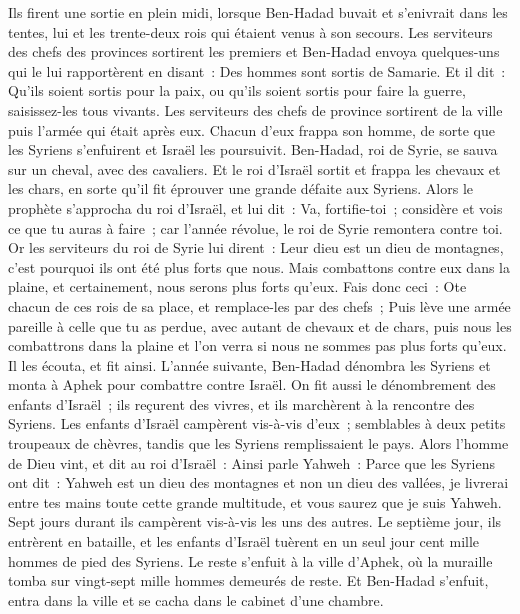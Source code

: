 \begin{multicols}{2}
Ils firent une sortie en plein midi, lorsque Ben-Hadad buvait et s'enivrait dans les tentes, lui et les trente-deux rois qui étaient venus à son secours.
Les serviteurs des chefs des provinces sortirent les premiers et Ben-Hadad envoya quelques-uns qui le lui rapportèrent en disant~: Des hommes sont sortis de Samarie.
Et il dit~: Qu'ils soient sortis pour la paix, ou qu'ils soient sortis pour faire la guerre, saisissez-les tous vivants.
Les serviteurs des chefs de province sortirent de la ville puis l'armée qui était après eux.
Chacun d'eux frappa son homme, de sorte que les Syriens s'enfuirent et Israël les poursuivit. Ben-Hadad, roi de Syrie, se sauva sur un cheval, avec des cavaliers.
Et le roi d'Israël sortit et frappa les chevaux et les chars, en sorte qu'il fit éprouver une grande défaite aux Syriens.
Alors le prophète s'approcha du roi d'Israël, et lui dit~: Va, fortifie-toi~; considère et vois ce que tu auras à faire~; car l'année révolue, le roi de Syrie remontera contre toi.
Or les serviteurs du roi de Syrie lui dirent~: Leur dieu est un dieu de montagnes, c'est pourquoi ils ont été plus forts que nous. Mais combattons contre eux dans la plaine, et certainement, nous serons plus forts qu'eux.
Fais donc ceci~: Ote chacun de ces rois de sa place, et remplace-les par des chefs~;
Puis lève une armée pareille à celle que tu as perdue, avec autant de chevaux et de chars, puis nous les combattrons dans la plaine et l'on verra si nous ne sommes pas plus forts qu'eux. Il les écouta, et fit ainsi.
L'année suivante, Ben-Hadad dénombra les Syriens et monta à Aphek pour combattre contre Israël.
On fit aussi le dénombrement des enfants d'Israël~; ils reçurent des vivres, et ils marchèrent à la rencontre des Syriens. Les enfants d'Israël campèrent vis-à-vis d'eux~; semblables à deux petits troupeaux de chèvres, tandis que les Syriens remplissaient le pays.
Alors l'homme de Dieu vint, et dit au roi d'Israël~: Ainsi parle Yahweh~: Parce que les Syriens ont dit~: Yahweh est un dieu des montagnes et non un dieu des vallées, je livrerai entre tes mains toute cette grande multitude, et vous saurez que je suis Yahweh.
Sept jours durant ils campèrent vis-à-vis les uns des autres. Le septième jour, ils entrèrent en bataille, et les enfants d'Israël tuèrent en un seul jour cent mille hommes de pied des Syriens.
Le reste s'enfuit à la ville d'Aphek, où la muraille tomba sur vingt-sept mille hommes demeurés de reste. Et Ben-Hadad s'enfuit, entra dans la ville et se cacha dans le cabinet d'une chambre. 

\end{multicols}
